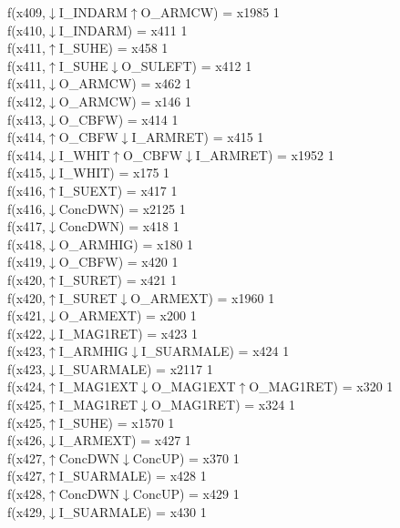 f(x409,$\downarrow$I\_INDARM$\uparrow$O\_ARMCW) = x1985 {1} \\
f(x410,$\downarrow$I\_INDARM) = x411 {1} \\
f(x411,$\uparrow$I\_SUHE) = x458 {1} \\
f(x411,$\uparrow$I\_SUHE$\downarrow$O\_SULEFT) = x412 {1} \\
f(x411,$\downarrow$O\_ARMCW) = x462 {1} \\
f(x412,$\downarrow$O\_ARMCW) = x146 {1} \\
f(x413,$\downarrow$O\_CBFW) = x414 {1} \\
f(x414,$\uparrow$O\_CBFW$\downarrow$I\_ARMRET) = x415 {1} \\
f(x414,$\downarrow$I\_WHIT$\uparrow$O\_CBFW$\downarrow$I\_ARMRET) = x1952 {1} \\
f(x415,$\downarrow$I\_WHIT) = x175 {1} \\
f(x416,$\uparrow$I\_SUEXT) = x417 {1} \\
f(x416,$\downarrow$ConcDWN) = x2125 {1} \\
f(x417,$\downarrow$ConcDWN) = x418 {1} \\
f(x418,$\downarrow$O\_ARMHIG) = x180 {1} \\
f(x419,$\downarrow$O\_CBFW) = x420 {1} \\
f(x420,$\uparrow$I\_SURET) = x421 {1} \\
f(x420,$\uparrow$I\_SURET$\downarrow$O\_ARMEXT) = x1960 {1} \\
f(x421,$\downarrow$O\_ARMEXT) = x200 {1} \\
f(x422,$\downarrow$I\_MAG1RET) = x423 {1} \\
f(x423,$\uparrow$I\_ARMHIG$\downarrow$I\_SUARMALE) = x424 {1} \\
f(x423,$\downarrow$I\_SUARMALE) = x2117 {1} \\
f(x424,$\uparrow$I\_MAG1EXT$\downarrow$O\_MAG1EXT$\uparrow$O\_MAG1RET) = x320 {1} \\
f(x425,$\uparrow$I\_MAG1RET$\downarrow$O\_MAG1RET) = x324 {1} \\
f(x425,$\uparrow$I\_SUHE) = x1570 {1} \\
f(x426,$\downarrow$I\_ARMEXT) = x427 {1} \\
f(x427,$\uparrow$ConcDWN$\downarrow$ConcUP) = x370 {1} \\
f(x427,$\uparrow$I\_SUARMALE) = x428 {1} \\
f(x428,$\uparrow$ConcDWN$\downarrow$ConcUP) = x429 {1} \\
f(x429,$\downarrow$I\_SUARMALE) = x430 {1} \\
